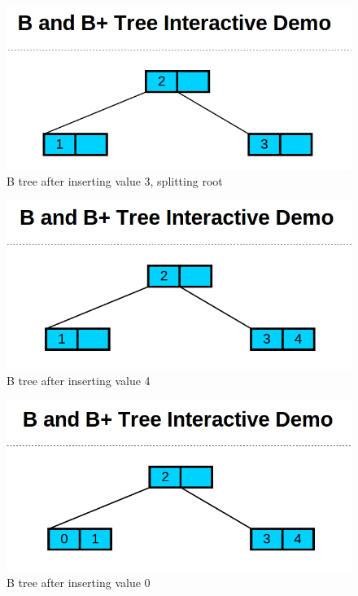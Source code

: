 \begin{figure}[htp!]
\centering
\includegraphics[scale=0.25]{images/Insert_three_split_root.png}
\caption{B tree after inserting value 3, splitting root}
\label{EX3}
\end{figure}

\begin{figure}[htp!]
\centering
\includegraphics[scale=0.25]{images/Insert_four.png}
\caption{B tree after inserting value 4}
\label{EX4}
\end{figure}
\clearpage

\begin{figure}[htp!]
\centering
\includegraphics[scale=0.25]{images/Insert_zero.png}
\caption{B tree after inserting value 0}
\label{EX5}
\end{figure}
